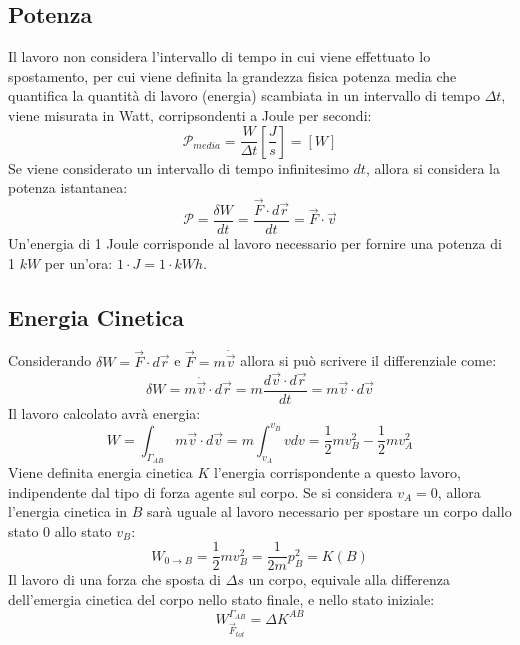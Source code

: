 \documentclass{article}
\numberwithin{equation}{subsection}
\begin{document}
\subsection{Potenza}
Il lavoro non considera l'intervallo di tempo in cui viene effettuato 
lo spostamento, per cui viene definita la grandezza fisica potenza media 
che quantifica la quantità di lavoro (energia) scambiata in un intervallo 
di tempo $\Delta t$, viene misurata in Watt, corripsondenti a Joule per secondi: 
\begin{equation}
    \mathscr{P}_{media}=\displaystyle\frac{W}{\Delta t}\left[\displaystyle\frac{J}{s}\right]=[W]
\end{equation}
Se viene considerato un intervallo di tempo infinitesimo $dt$, allora 
si considera la potenza istantanea:
\begin{equation}
    \mathscr{P}=\displaystyle\frac{\delta W}{dt}=\frac{\vec{F}\cdot d\vec{r}}{dt}=\vec{F}\cdot\vec{v}
\end{equation}
Un'energia di 1 Joule corrisponde al lavoro necessario per fornire 
una potenza di 1 $kW$ per un'ora: $1\cdot J=1\cdot kW h$.

\subsection{Energia Cinetica}
Considerando $\delta W=\vec{F}\cdot d\vec{r}$ e $\vec{F}=m\dot{\vec{v}}$ 
allora si può scrivere il differenziale come:
\begin{equation}
    \delta W=m\dot{\vec{v}}\cdot d\vec{r}=m\displaystyle\frac{d\vec{v}\cdot d\vec{r}}{dt}=m\vec{v}\cdot d\vec{v}
\end{equation}
Il lavoro calcolato avrà energia:
\begin{equation}
    W=\int_{\Gamma_{AB}}m\vec{v}\cdot d\vec{v}=m\int_{v_A}^{v_B}vdv=\displaystyle\frac{1}{2}mv_B^2-\frac{1}{2}mv_A^2
\end{equation}
Viene definita energia cinetica $K$ l'energia corrispondente a questo 
lavoro, indipendente dal tipo di forza agente sul corpo. Se si 
considera $v_A=0$, allora l'energia cinetica in $B$ sarà uguale al 
lavoro necessario per spostare un corpo dallo stato $0$ allo stato $v_B$:
\begin{equation}
    W_{0\to B}=\displaystyle\frac{1}{2}mv_B^{2}=\frac{1}{2m}p^2_B=K(B)
\end{equation}
Il lavoro di una forza che sposta di $\Delta s$ un corpo, equivale 
alla differenza dell'emergia cinetica del corpo nello stato finale, 
e nello stato iniziale:
\begin{equation}
    W_{\vec{F}_{tot}}^{\Gamma_{AB}}=\Delta K^{AB}
\end{equation}
\end{document}

